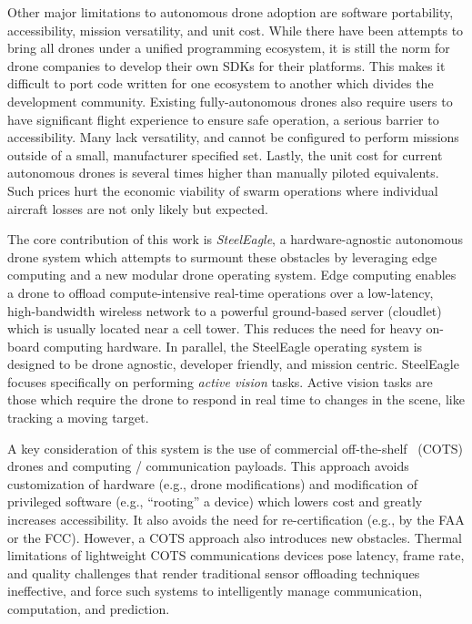 Other major limitations to autonomous drone adoption are software portability, accessibility, mission versatility, and unit cost. While there have been attempts to bring all drones under a unified programming ecosystem, it is still the norm for drone companies to develop their own SDKs for their platforms. This makes it difficult to port code written for one ecosystem to another which divides the development community. Existing fully-autonomous drones also require users to have significant flight experience to ensure safe operation, a serious barrier to accessibility. Many lack versatility, and cannot be configured to perform missions outside of a small, manufacturer specified set. Lastly, the unit cost for current autonomous drones is several times higher than manually piloted equivalents. Such prices hurt the economic viability of swarm operations where individual aircraft losses are not only likely but expected.

The core contribution of this work is \textit{SteelEagle}, a hardware-agnostic autonomous drone system which attempts to surmount these obstacles by leveraging edge computing and a new modular drone operating system. Edge computing enables a drone to offload compute-intensive real-time operations over a low-latency, high-bandwidth wireless network to a powerful ground-based server (cloudlet) which is usually located near a cell tower. This reduces the need for heavy on-board computing hardware. In parallel, the SteelEagle operating system is designed to be drone agnostic, developer friendly, and mission centric. SteelEagle focuses specifically on performing \textit{active vision} tasks. Active vision tasks are those which require the drone to respond in real time to changes in the scene, like tracking a moving target.

A key consideration of this system is the use of commercial off-the-shelf~\cite{FAR} (COTS) drones and computing / communication payloads. This approach avoids customization of hardware (e.g., drone modifications) and modification of privileged software (e.g., “rooting” a device) which lowers cost and greatly increases accessibility. It also avoids the need for re-certification (e.g., by the FAA or the FCC). However, a COTS approach also introduces new obstacles. Thermal limitations of lightweight COTS communications devices pose latency, frame rate, and quality challenges that render traditional sensor offloading techniques ineffective, and force such systems to intelligently manage communication, computation, and prediction.

